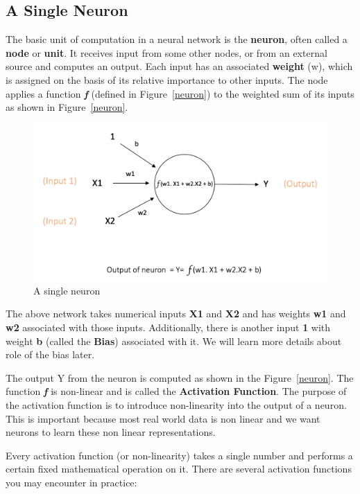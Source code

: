 \documentclass{article}
\begin{document}
\subsection{A Single Neuron}

The basic unit of computation in a neural network is the \textbf{neuron}, often called a \textbf{node} or \textbf{unit}. It receives input from some other nodes, or from an external source and computes an output. Each input has an associated \textbf{weight} (w), which is assigned on the basis of its relative importance to other inputs. The node applies a function \emph{\textbf{f}} (defined in Figure~\ref{neuron}) to the weighted sum of its inputs as shown in Figure~\ref{neuron}.

\begin{figure}[!h]
	\centering
		\includegraphics[width=\columnwidth]{images/neuron.png}
		\caption{A single neuron}\label{neuron}
	\label{fig:graph}
\end{figure}

The above network takes numerical inputs \textbf{X1} and \textbf{X2} and has weights \textbf{w1} and \textbf{w2} associated with those inputs. Additionally, there is another input \textbf{1} with weight \textbf{b} (called the \textbf{Bias}) associated with it. We will learn more details about role of the bias later.

The output Y from the neuron is computed as shown in the Figure~\ref{neuron}. The function \emph{\textbf{f}} is non-linear and is called the \textbf{Activation Function}. The purpose of the activation function is to introduce non-linearity into the output of a neuron. This is important because most real world data is non linear and we want neurons to learn these non linear representations.

Every activation function (or non-linearity) takes a single number and performs a certain fixed mathematical operation on it. There are several activation functions you may encounter in practice:
\end{document}
